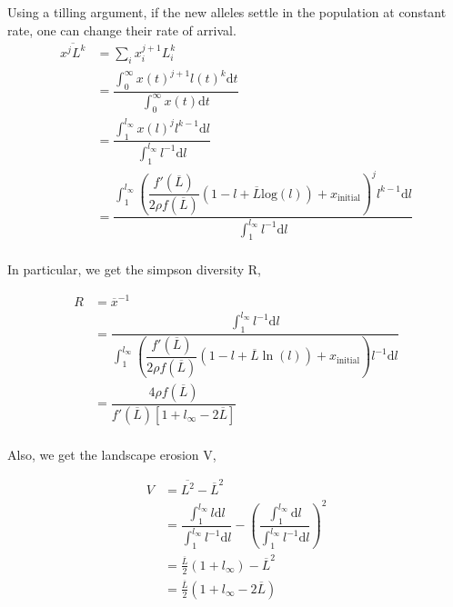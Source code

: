 \documentclass{article}
\begin{document}
Using a tilling argument, if the new alleles settle in the population at constant rate, one can change their rate of arrival.
\begin{equation}
  \begin{aligned}
    \overline{x^{j} L^{k}} &= \sum_i x_i^{j+1} L_i^{k} \\
    &= \dfrac{ \int_{0}^{\infty} x(t)^{j+1} l(t)^{k} \mathrm{d} t }{ \int_{0}^{\infty} x(t) \mathrm{d} t }
    \\
    &= \dfrac{ \int_{1}^{l_{\infty}} x(l)^{j} l^{k-1} \mathrm{d} l  }{ \int_{1}^{l_{\infty}} l^{-1} \mathrm{d} l }
    \\
    &= \dfrac{ \int_{1}^{l_{\infty}} \left( \dfrac{f'(\overline{L})}{2 \rho f(\overline{L})} (1-l + \overline{L} \mathrm{log}(l)) + x_{\mathrm{initial}}  \right)^{j} l^{k-1} \mathrm{d} l  }{ \int_{1}^{l_{\infty}} l^{-1} \mathrm{d} l }
    \\
  \end{aligned}
\end{equation}

In particular, we get the simpson diversity R,

\begin{equation}
  \begin{aligned}
    R &= \overline{x}^{-1} \\
    &=  \dfrac{ \int_{1}^{l_{\infty}} l^{-1} \mathrm{d} l }{ \int_{1}^{l_{\infty}} \left( \dfrac{f'(\overline{L})}{2 \rho f(\overline{L})} (1-l + \overline{L} \ln(l)) + x_{\mathrm{initial}}  \right) l^{-1} \mathrm{d} l } 
    \\
    &= \dfrac{4 \rho f(\overline{L})}{f'(\overline{L})\left[ 1 + l_{\infty} - 2 \overline{L}  \right]} 
    \\
  \end{aligned}
\end{equation}

Also, we get the landscape erosion V,

\begin{equation}
  \begin{aligned}
    V &=  \overline{L^2} - \overline{L}^2 \\
    &= \dfrac{ \int_{1}^{l_{\infty}} l \mathrm{d} l  }{ \int_{1}^{l_{\infty}} l^{-1} \mathrm{d} l } - \left( \dfrac{ \int_{1}^{l_{\infty}} \mathrm{d} l  }{ \int_{1}^{l_{\infty}} l^{-1} \mathrm{d} l } \right)^2
    \\
    &= \frac{\overline{L}}{2}  \left(1 + l_{\infty}\right) - \overline{L}^2
    \\
    &= \frac{\overline{L}}{2}  \left(1 + l_{\infty} - 2 \overline{L}\right)
    \\
  \end{aligned}
\end{equation}
\end{document}
